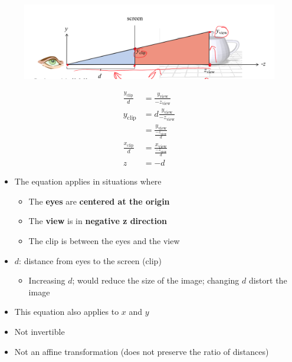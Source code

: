       \begin{figure}[H]
        \centering
        \includegraphics[width=0.7\columnwidth]{images/pipelines/perspective-equation.png}
      \end{figure}

      \begin{align}
        \frac{y_{\text{clip}}}{d}
        &= \frac{y_{\text{view}}}{-z_{\text{view}}} \\
        y_{\text{clip}}
        &= d\frac{y_ {\text{view}}}{-z_{\text{view}}} \\
        &= \frac{y_{\text{view}}}{\frac{-z_{\text{view}}}{d}} \\
        \frac{x_{\text{clip}}}{d}
        &= \frac{x_{\text{view}}}{\frac{-z_{\text{view}}}{d}} \\
        z &= -d
      \end{align}

      \begin{itemize}
        \item The equation applies in situations where
        \begin{itemize}
          \item The \textbf{eyes} are \textbf{centered at the origin}
          \item The \textbf{view} is in \textbf{negative z direction}
          \item The clip is between the eyes and the view
        \end{itemize}

        \item $ d $: distance from eyes to the screen (clip)
        \begin{itemize}
          \item Increasing $ d $; would reduce the size of the image; changing
          $ d $ distort the image
        \end{itemize}
        \item This equation also applies to $ x $ and $ y $
        \item Not invertible
        \item Not an affine transformation (does not preserve the ratio of
        distances)
      \end{itemize}

